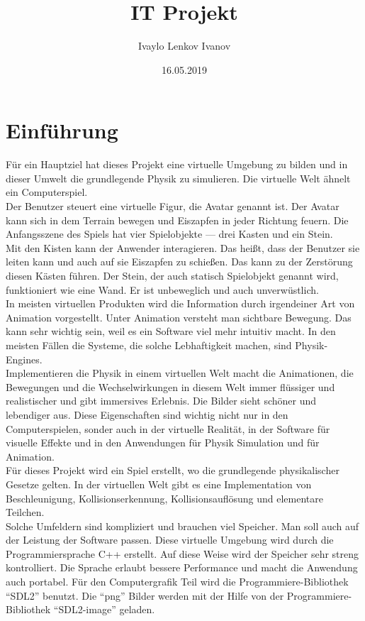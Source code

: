 \documentclass[
  10pt,
  a4paper,
  oneside,
  headers,
  headinclude,
  footinclude,
  BCOR5mm,
]{article}
\title{IT Projekt}
\date{16.05.2019}
\author{Ivaylo Lenkov Ivanov}
\begin{document}
\begin{titlepage}
  \maketitle
  \tableofcontents
  \pagebreak
  \listoffigures
\end{titlepage}

\section{Einführung}
Für ein Hauptziel hat dieses Projekt eine virtuelle Umgebung zu bilden und in
dieser Umwelt die grundlegende Physik zu simulieren. Die virtuelle Welt ähnelt
ein Computerspiel. \\
Der Benutzer steuert eine virtuelle Figur, die Avatar genannt ist.
Der Avatar kann sich in dem Terrain bewegen und Eiszapfen in jeder Richtung
feuern. Die Anfangsszene des Spiels hat vier Spielobjekte --- drei Kasten und
ein Stein. \\
Mit den Kisten kann der Anwender interagieren. Das heißt, dass der Benutzer sie
leiten kann und auch auf sie Eiszapfen zu schießen. Das kann zu der
Zerstörung diesen Kästen führen. Der Stein, der auch statisch Spielobjekt
genannt wird, funktioniert wie eine Wand. Er ist unbeweglich und auch
unverwüstlich. \\
In meisten virtuellen Produkten wird die Information durch irgendeiner Art von
Animation vorgestellt. Unter Animation versteht man sichtbare Bewegung. Das kann
sehr wichtig sein, weil es ein Software viel mehr intuitiv macht. In den meisten
Fällen die Systeme, die solche Lebhaftigkeit machen, sind Physik-Engines. \\
Implementieren die Physik in einem virtuellen Welt macht die Animationen, die
Bewegungen und die Wechselwirkungen in diesem Welt immer flüssiger und
realistischer und gibt immersives Erlebnis. Die Bilder sieht schöner und
lebendiger aus. Diese Eigenschaften sind wichtig nicht nur in den
Computerspielen, sonder auch in der virtuelle Realität, in der Software für
visuelle Effekte und in den Anwendungen für Physik Simulation und für
Animation. \\
Für dieses Projekt wird ein Spiel erstellt, wo die grundlegende physikalischer
Gesetze gelten. In der virtuellen Welt gibt es eine Implementation von
Beschleunigung, Kollisionserkennung, Kollisionsauflösung und elementare
Teilchen. \\
Solche Umfeldern sind kompliziert und brauchen viel Speicher. Man soll auch auf
der Leistung der Software passen. Diese virtuelle Umgebung wird durch die
Programmiersprache C++ erstellt. Auf diese Weise wird der Speicher sehr streng
kontrolliert. Die Sprache erlaubt bessere Performance und macht die Anwendung
auch portabel. Für den Computergrafik Teil wird die Programmiere-Bibliothek
``SDL2'' benutzt. Die ``png'' Bilder werden mit der Hilfe von der
Programmiere-Bibliothek ``SDL2-image'' geladen. \\
\end{document}
